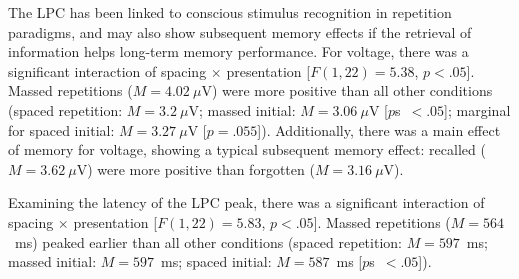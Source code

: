 

The LPC has been linked to conscious stimulus recognition in repetition paradigms, and may also show subsequent memory effects if the retrieval of information helps long-term memory performance.
For voltage, there was a significant interaction of spacing $\times$ presentation [$F(1,22)=5.38$, $p<.05$].  Massed repetitions ($M=4.02~\mu$V) were more positive than all other conditions (spaced repetition: $M=3.2~\mu$V; massed initial: $M=3.06~\mu$V [$p$s~$<.05$]; marginal for spaced initial: $M=3.27~\mu$V [$p=.055$]).  Additionally, there was a main effect of memory for voltage, showing a typical subsequent memory effect: recalled ($M=3.62~\mu$V) were more positive than forgotten ($M=3.16~\mu$V).

Examining the latency of the LPC peak, there was a significant interaction of spacing $\times$ presentation [$F(1,22)=5.83$, $p<.05$].  Massed repetitions ($M=564$~ms) peaked earlier than all other conditions (spaced repetition: $M=597$~ms; massed initial: $M=597$~ms; spaced initial: $M=587$~ms [$p$s~$<.05$]).    

